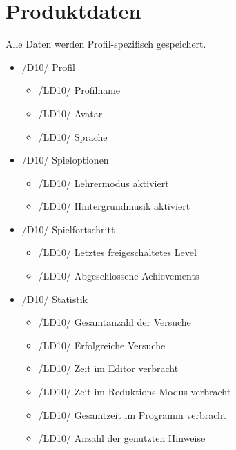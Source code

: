 \section{Produktdaten}

Alle Daten werden Profil-spezifisch gespeichert.

\begin{itemize}

\item /D10/ Profil
\begin{itemize}
\item /LD10/ Profilname
\item /LD10/ Avatar
\item /LD10/ Sprache
\end{itemize}

\item /D10/ Spieloptionen
\begin{itemize}
\item /LD10/ Lehrermodus aktiviert
\item /LD10/ Hintergrundmusik aktiviert
\end{itemize}

\item /D10/ Spielfortschritt
\begin{itemize}
\item /LD10/ Letztes freigeschaltetes Level
\item /LD10/ Abgeschlossene Achievements
\end{itemize}

\item /D10/ Statistik
\begin{itemize}
\item /LD10/ Gesamtanzahl der Versuche
\item /LD10/ Erfolgreiche Versuche
\item /LD10/ Zeit im Editor verbracht
\item /LD10/ Zeit im Reduktions-Modus verbracht
\item /LD10/ Gesamtzeit im Programm verbracht
\item /LD10/ Anzahl der genutzten Hinweise
\end{itemize}

\end{itemize}